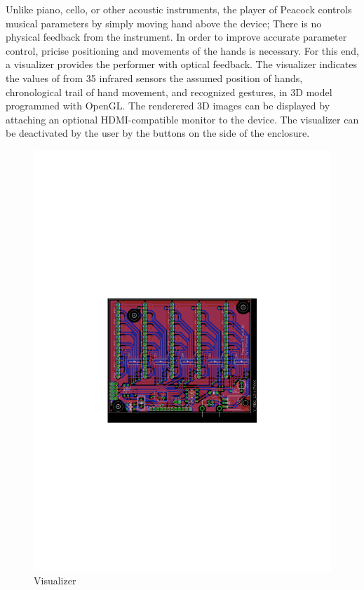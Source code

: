 \documentclass{nime-alternate}
\begin{document}
Unlike piano, cello, or other acoustic instruments, the player of Peacock controls musical parameters by simply moving hand above the device; There is no physical feedback from the instrument. In order to improve accurate parameter control, pricise positioning and movements of the hands is necessary. For this end, a visualizer provides the performer with optical feedback.  The visualizer indicates the values of from 35 infrared sensors  the assumed position of hands, chronological trail of hand movement, and recognized gestures, in  3D model programmed with OpenGL\cite{OpenGL}. The renderered 3D images can be displayed by attaching an optional HDMI-compatible monitor to the device.
The visualizer can be deactivated by the user by the buttons on the side of the enclosure.

\begin{figure}[htbp]
       \centering
              \includegraphics[width=1\columnwidth]{board}
       \caption{Visualizer}
       \label{fig:modules}
\end{figure}
\end{document}
